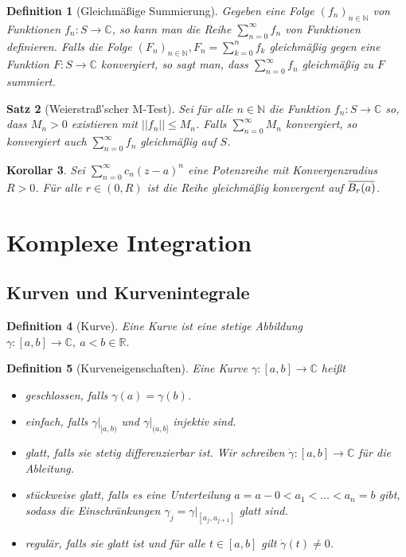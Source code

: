 \documentclass[a4paper,12pt]{article}
\theoremstyle{newthm}
\newtheorem{thm}{Satz}[subsection]
\newtheorem{cor}[thm]{Korollar}
\theoremstyle{newdef}
\newtheorem{defn}[thm]{Definition}
\theoremstyle{newrem}
\newcommand{\N}{\mathbb{N}}
\newcommand{\R}{\mathbb{R}}
\newcommand{\C}{\mathbb{C}}
\newcommand{\bound}[2]{\left.#1\right|_{#2}}
\newcommand{\overbar}[1]{\mkern 1.5mu\overline{\mkern-1.5mu#1\mkern-1.5mu}\mkern 1.5mu}
\begin{document}
		\begin{defn}[Gleichmäßige Summierung]
			Gegeben eine Folge $ (f_n)_{n \in \N} $ von Funktionen $ f_n: S \to \C $, so kann man die Reihe $ \sum\limits_{n=0}^\infty f_n $ von Funktionen definieren. Falls die Folge $ (F_n)_{n \in \N}, F_n = \sum\limits_{k=0}^n f_k $ gleichmäßig gegen eine Funktion $ F: S \to \C $ konvergiert, so sagt man, dass $ \sum\limits_{n=0}^\infty f_n $ \emph{gleichmäßig zu $F$ summiert}.
		\end{defn}
		
		\begin{thm}[Weierstraß'scher M-Test]
			Sei für alle $ n \in \N $ die Funktion $ f_n:S \to \C $ so, dass $ M_n > 0 $ existieren mit $ ||f_n|| \leq M_n $. Falls $ \sum\limits_{n=0}^\infty M_n $ konvergiert, so konvergiert auch $ \sum\limits_{n=0}^\infty f_n $ gleichmäßig auf $S$.
		\end{thm}
		
		\begin{cor}
			Sei $ \sum\limits_{n=0}^\infty c_n (z-a)^n $ eine Potenzreihe mit Konvergenzradius $ R > 0 $. Für alle $ r \in (0,R) $ ist die Reihe gleichmäßig konvergent auf $ \overbar{B_r(a)} $.
		\end{cor}
		
	
	
	
	
	
\section{Komplexe Integration}
	
	\subsection{Kurven und Kurvenintegrale}
		
		\begin{defn}[Kurve]
			Eine \emph{Kurve} ist eine stetige Abbildung $ \gamma: [a,b] \to \C,\ a<b\in \R $.
		\end{defn}
		
		\begin{defn}[Kurveneigenschaften]
			Eine Kurve $ \gamma: [a,b] \to \C $ heißt
			\begin{itemize}
				\item \emph{geschlossen}, falls $ \gamma(a) = \gamma(b) $.
				\item \emph{einfach}, falls $ \bound{\gamma}{[a,b)} $ und $ \bound{\gamma}{(a,b]} $ injektiv sind.
				\item \emph{glatt}, falls sie stetig differenzierbar ist. Wir schreiben $ \dot{\gamma} : [a,b] \to \C $ für die Ableitung.
				\item \emph{stückweise glatt}, falls es eine Unterteilung $ a = a-0 < a_1 < \dots < a_n=b $ gibt, sodass die Einschränkungen $ \gamma_j = \bound{\gamma}{\left[a_j,a_{j+1}\right]} $ glatt sind.
				\item \emph{regulär}, falls sie glatt ist und für alle $ t \in [a,b] $ gilt $ \dot{\gamma}(t) \neq 0 $.
			\end{itemize}
		\end{defn}
		
\end{document}
